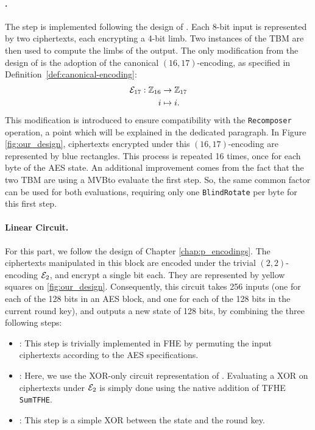 \paragraph{\SubBytes.} The \SubBytes step is implemented following the design of \cite{DBLP:conf/wahc/TramaCBS23}. Each 8-bit input is represented by two ciphertexts, each encrypting a 4-bit limb. Two instances of the \gls{TBM} are then used to compute the limbs of the output. The only modification from the design of \cite{DBLP:conf/wahc/TramaCBS23} is the adoption of the canonical $(16, 17)$-encoding, as specified in Definition~\ref{def:canonical-encoding}:
\begin{align*}
    \mathcal{E}_{17}: \mathbb{Z}_{16} &\rightarrow \mathbb{Z}_{17}\\
     i &\mapsto i.
\end{align*}
This modification is introduced to ensure compatibility with the \texttt{Recomposer} operation, a point which will be explained in the dedicated paragraph. In Figure \ref{fig:our_design}, ciphertexts encrypted under this $(16, 17)$-encoding are represented by blue rectangles. This process is repeated 16 times, once for each byte of the \gls{AES} state.
An additional improvement comes from the fact that the two \gls{TBM} are using a \gls{MVB}to evaluate the first step. So, the same common factor can be used for both evaluations, requiring only one \texttt{BlindRotate} per byte for this first step. 


\paragraph{Linear Circuit.} For this part, we follow the design of Chapter \ref{chap:p_encodings}. The ciphertexts manipulated in this block are encoded under the trivial $(2, 2)$-encoding $\mathcal{E}_2$, and encrypt a single bit each. They are represented by yellow squares on \ref{fig:our_design}. Consequently, this circuit takes 256 inputs (one for each of the 128 bits in an \gls{AES} block, and one for each of the 128 bits in the current round key), and outputs a new state of 128 bits, by combining the three following steps:
\begin{itemize}
    \item \ShiftRows: This step is trivially implemented in \gls{FHE} by permuting the input ciphertexts according to the \gls{AES} specifications.
    \item \MixColumns: Here, we use the XOR-only circuit representation of \cite{EPRINT:Maximov19}. Evaluating a XOR on ciphertexts under $\mathcal{E}_2$ is simply done using the native addition of \gls{TFHE} \texttt{SumTFHE}.
    \item \AddRoundKey: This step is a simple XOR between the state and the round key.
\end{itemize}

